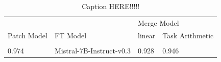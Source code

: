 \begin{table}[h]
\centering
\caption{Caption HERE!!!!!}
\label{tab:hogealpha}
\begin{tabular}{l|l|ll}
\hline \hline
                              &                                            & \multicolumn{2}{l}{Merge Model}                                                                                      \\ \cline{3-4} 
\multirow{-2}{*}{Patch Model} & \multirow{-2}{*}{FT Model}                 & \multicolumn{1}{l|}{linear}                                         & Task Arithmetic                                \\ \hline
                              &                                            & \multicolumn{1}{l|}{{\color[HTML]{CB0000} }}                        & {\color[HTML]{CB0000} }                        \\
\multirow{-2}{*}{0.974}       & \multirow{-2}{*}{Mistral-7B-Instruct-v0.3} & \multicolumn{1}{l|}{\multirow{-2}{*}{{\color[HTML]{CB0000} 0.928}}} & \multirow{-2}{*}{{\color[HTML]{CB0000} 0.946}} \\ \hline \hline
\end{tabular}
\end{table}

